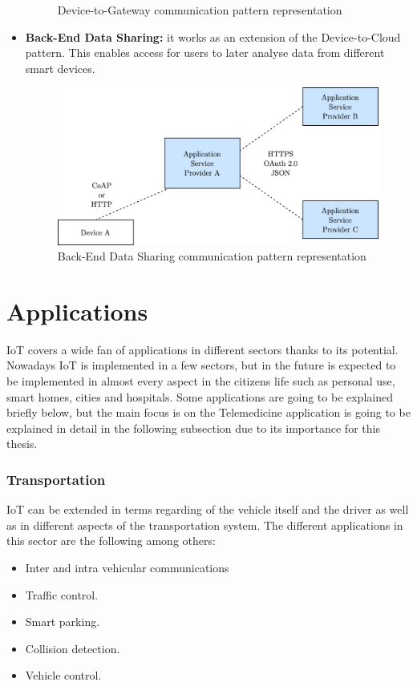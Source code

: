 \documentclass[11pt]{book}
\begin{document}
\begin{itemize}
\begin{figure}[H]
	\caption{Device-to-Gateway communication pattern representation}
\end{figure}
\item \textbf{Back-End Data Sharing:} it works as an extension of the Device-to-Cloud pattern. This enables access for users to later analyse data from different smart devices. 
\begin{figure}[H]
	\centering
	\includegraphics [scale=0.165] {backendsharing.png}
	\caption{Back-End Data Sharing communication pattern representation}
\end{figure}
\end{itemize}

\section{Applications}
IoT covers a wide fan of applications in different sectors thanks to its potential. Nowadays IoT is implemented in a few sectors, but in the future is expected to be implemented in almost every aspect in the citizens life such as personal use, smart homes, cities and hospitals. Some applications are going to be explained briefly below, but the main focus is on the Telemedicine application is going to be explained in detail in the following subsection due to its importance for this thesis. 
\subsubsection{Transportation}
IoT can be extended in terms regarding of the vehicle itself and the driver as well as in different aspects of the transportation system. The different applications in this sector are the following among others:
\begin{itemize}
\item Inter and intra vehicular communications
\item Traffic control.
\item Smart parking.
\item Collision detection.
\item Vehicle control.
\end{itemize}
\end{document}
